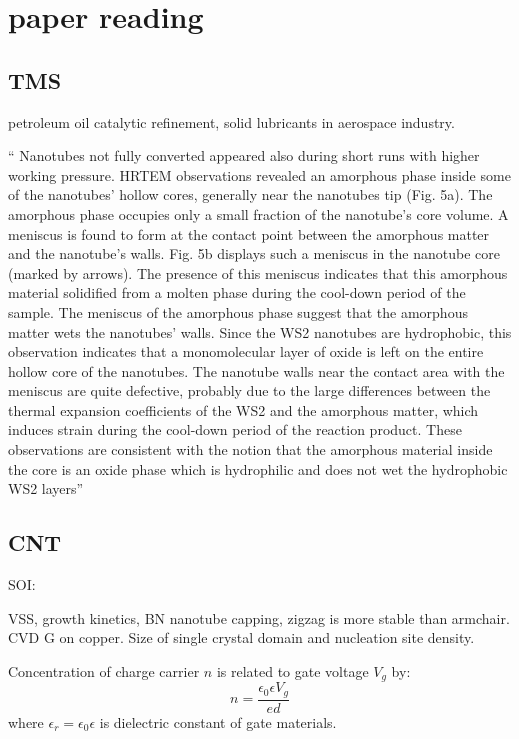 \chapter{paper reading}

\section{TMS}

petroleum oil catalytic refinement, solid lubricants in aerospace industry.

`` Nanotubes not fully converted appeared also during short
runs with higher working pressure. HRTEM observations
revealed an amorphous phase inside some of the nanotubes’
hollow cores, generally near the nanotubes tip (Fig. 5a). The
amorphous phase occupies only a small fraction of the nanotube’s
core volume. A meniscus is found to form at the contact
point between the amorphous matter and the nanotube’s walls.
Fig. 5b displays such a meniscus in the nanotube core (marked
by arrows). The presence of this meniscus indicates that this
amorphous material solidified from a molten phase during the
cool-down period of the sample. The meniscus of the amorphous
phase suggest that the amorphous matter wets the
nanotubes’ walls. Since the WS2 nanotubes are hydrophobic,
this observation indicates that a monomolecular layer of oxide
is left on the entire hollow core of the nanotubes. The nanotube
walls near the contact area with the meniscus are quite defective,
probably due to the large differences between the thermal
expansion coefficients of the WS2 and the amorphous matter,
which induces strain during the cool-down period of the
reaction product. These observations are consistent with the
notion that the amorphous material inside the core is an oxide
phase which is hydrophilic and does not wet the hydrophobic
WS2 layers''\cite{Margolin2004}

\section{CNT}

SOI:

VSS, growth kinetics,
BN nanotube capping, zigzag is more stable than armchair. \cite{Menon1999}
CVD G on copper. Size of single crystal domain and nucleation site density.\cite{Wu2013b}

Concentration of charge carrier $n$ is related to gate voltage $V_g$ by:
\[
n = \frac{\epsilon_0 \epsilon V_g}{ed}
\]
where $\epsilon_r = \epsilon_0 \epsilon$ is dielectric constant of gate materials.

